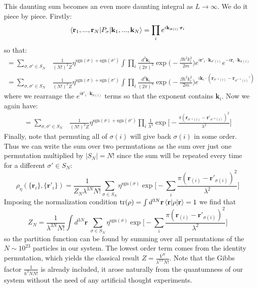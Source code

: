 \documentclass[a4paper,11pt,oneside]{book}
\begin{document}
This daunting sum becomes an even more daunting integral as $L \rightarrow \infty$. We do it piece by piece. Firstly:
\begin{equation}
    \braket{\textbf{r}_1,...,\textbf{r}_N|P_\sigma|\textbf{k}_1,...,\textbf{k}_N} = \prod_i e^{i\textbf{k}_{\sigma(i)}\cdot \textbf{r}_i}
\end{equation}
so that:
\begin{align}
= \sum_{\sigma,\sigma' \in S_N}& \frac{1}{(N!)^2Z} \eta^{\text{sgn}(\sigma)+\text{sgn}(\sigma')}\int \prod_i \frac{d^3\textbf{k}_i}{(2\pi)^3}   \exp\bigg(-\frac{\beta \hbar^2 k_i^2}{2m}\bigg)e^{i\textbf{r}'_i\cdot\textbf{k}_{\sigma'(i)}}e^{-i\textbf{r}_i \cdot \textbf{k}_{\sigma(i)}}\\
= \sum_{\sigma,\sigma' \in S_N}& \frac{1}{(N!)^2Z} \eta^{\text{sgn}(\sigma)+\text{sgn}(\sigma')}\int \prod_i \frac{d^3\textbf{k}_i}{(2\pi)^3}   \exp\bigg(- \frac{\beta \hbar^2 k_i^2}{2m}\bigg)e^{i\textbf{k}_{i}\cdot(\textbf{r}_{\sigma^{-1}(i)}-\textbf{r}_{\sigma'^{-1}(i)}')}
\end{align}
where we rearrange the $e^{i\textbf{r}'_i\cdot \textbf{k}_{\sigma(i)}}$ terms so that the exponent contains $\textbf{k}_i$. Now we again have:
\begin{align}
    = \sum_{\sigma,\sigma' \in S_N}& \frac{1}{(N!)^2Z} \eta^{\text{sgn}(\sigma)+\text{sgn}(\sigma')} \prod_i \frac{1}{\lambda^3}\exp \bigg[-\frac{\pi(\textbf{r}_{\sigma^{-1}(i)}-\textbf{r}'_{\sigma^{-1}(i)})^2}{\lambda^2}\bigg]
\end{align}
Finally, note that permuting all of $\sigma(i)$ will give back $\sigma(i)$ in some order. Thus we can write the sum over two permutations as the sum over just one permutation multiplied by $|S_N|=N!$ since the sum will be repeated every time for a different $\sigma' \in S_N$:
\begin{equation}
     \boxed{\rho_\eta(\{\textbf{r}_i\},\{\textbf{r}'_i\})   = \frac{1}{Z_N \lambda^{3N} N!} \sum_{\sigma \in S_N} \eta^{\text{sgn}(\sigma)} \exp \bigg[-\sum_i\frac{\pi(\textbf{r}_{(i)}-\textbf{r}'_{\sigma(i)})^2}{\lambda^2}\bigg]}
\end{equation}
Imposing the normalization condition $\text{tr}(\rho) =\int d^{3N}\textbf{r} \braket{\textbf{r}|\rho|\textbf{r}}= 1$ we find that
\begin{equation}
    Z_N = \frac{1}{\lambda^{3N} N!} \int d^{3N}\textbf{r} \ \sum_{\sigma \in S_N} \eta^{\text{sgn}(\sigma)} \exp \bigg[-\sum_i\frac{\pi(\textbf{r}_{(i)}-\textbf{r}'_{\sigma(i)})^2}{\lambda^2}\bigg]
\end{equation}
so the partition function can be found by summing over all permutations of the $N\sim10^{23}$ particles in our system. The lowest order term comes from the identity permutation, which yields the classical result $Z = \frac{V^N}{\lambda^{3N}N!}$. Note that the Gibbs factor $\frac{1}{h^3N N!}$ is already included, it arose naturally from the quantumness of our system without the need of any artificial thought experiments.
\end{document}
